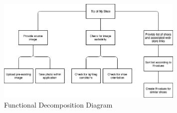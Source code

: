 \documentclass[12pt, titlepage]{article}
\begin{document}
\begin{figure}[H]
  \centering
  \includegraphics[width=0.8\textwidth]{images/Functional-Decomposition.png}
  \caption{Functional Decomposition Diagram}
\end{figure}
\end{document}
